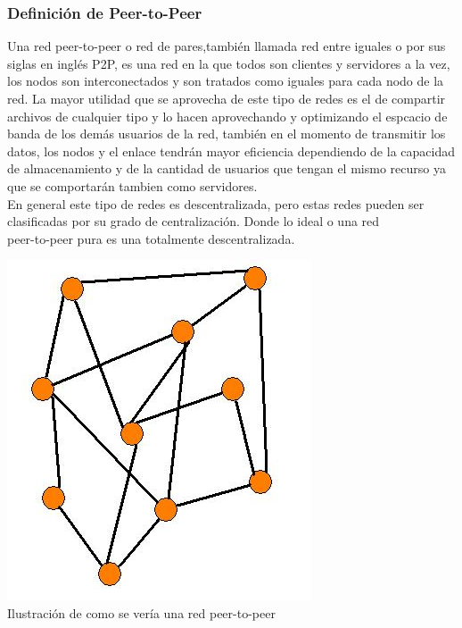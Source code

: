 \documentclass[12pt]{article}
\begin{document}
{{\subsubsection{Definici\'on de Peer-to-Peer}
Una red peer-to-peer o red de pares,tambi\'en llamada red entre iguales o por sus siglas en ingl\'es P2P, es una red en la que todos son clientes y servidores a la vez, los nodos son interconectados y son tratados como iguales para cada nodo de la red.
La mayor utilidad que se aprovecha de este tipo de redes es el de compartir archivos de cualquier tipo y lo hacen aprovechando y optimizando el espcacio de banda de los dem\'as usuarios de la red, tambi\'en en el momento de transmitir los datos, los nodos y el enlace tendr\'an mayor eficiencia dependiendo de la capacidad de almacenamiento y de la cantidad de usuarios que tengan el mismo recurso ya que se comportar\'an tambien como servidores.\\
En general este tipo de redes es descentralizada, pero estas redes pueden ser clasificadas por su grado de centralizaci\'on. Donde lo ideal o una red \\peer-to-peer pura es una totalmente descentralizada.\\
}
\vspace{0.2in}
{\centering
\includegraphics[scale=0.6]{P2P.jpg}\\
\small{Ilustraci\'on de como se ver\'ia una red peer-to-peer}
}\\

{\raggedright
}}
\end{document}
